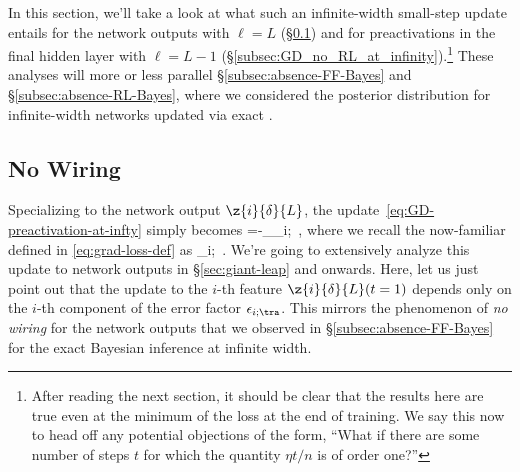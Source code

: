 In this section, we'll take a look at what such an infinite-width small-step update entails for the network outputs with $\ell=L$ (\S\ref{subsec:GD_no_wiring_at_infinity}) and for preactivations in the final hidden layer  with $\ell=L-1$ (\S\ref{subsec:GD_no_RL_at_infinity}).\footnote{After reading the next section, it should be clear that the results here are true even at the minimum of the loss at the end of training. We say this now to head off any potential objections of the form, ``What if there are some number of steps $t$ for which the quantity $\eta t/n$ is of order one?''
}
 These analyses will more or less parallel \S\ref{subsec:absence-FF-Bayes} and \S\ref{subsec:absence-RL-Bayes}, where we considered the posterior distribution for infinite-width networks updated via exact .


\subsection{No Wiring}\label{subsec:GD_no_wiring_at_infinity}
Specializing to  the network output $\z{i}{\delta}{L}$, the update~\eqref{eq:GD-preactivation-at-infty} 
simply becomes
\be\label{eq:GD-output-at-infty}
=-\eta\sum_{\tra\in\A}\epsilon_{i;\tra}\, ,
\ee
where we recall the now-familiar  defined in \eqref{eq:grad-loss-def} as
\be\label{eq:error-factor-reprint}
\epsilon_{i;\tra}\equiv {}\, .
\ee
We're going to extensively analyze this update to network outputs in \S\ref{sec:giant-leap} and onwards. 
Here, let us just point out that the update to the $i$-th feature $\z{i}{\delta}{L}(t=1)$ depends only on the $i$-th component of the error factor $\epsilon_{i;\tra}$. This mirrors the phenomenon of \emph{no wiring} for the network outputs that we observed in \S\ref{subsec:absence-FF-Bayes} for the exact Bayesian inference at infinite width. 

